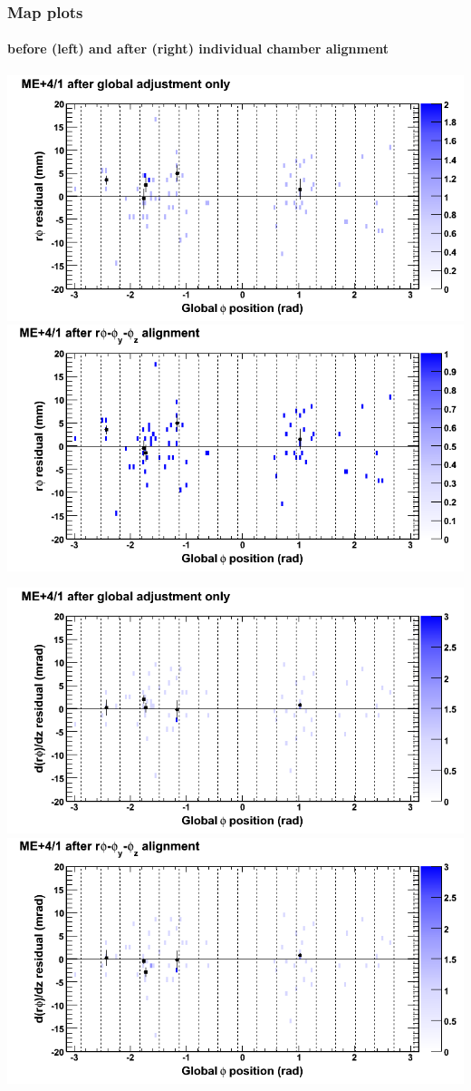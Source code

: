 \documentclass[compress]{beamer}
\begin{document}
\begin{frame}
\frametitle{Map plots}
\framesubtitle{before (left) and after (right) individual chamber alignment}
\includegraphics[width=0.5\linewidth]{ringmapplots_3dof/before_CSCvsphi_mep41_x.png} \includegraphics[width=0.5\linewidth]{ringmapplots_3dof/after_CSCvsphi_mep41_x.png}

\includegraphics[width=0.5\linewidth]{ringmapplots_3dof/before_CSCvsphi_mep41_dxdz.png} \includegraphics[width=0.5\linewidth]{ringmapplots_3dof/after_CSCvsphi_mep41_dxdz.png}
\end{frame}
\end{document}
